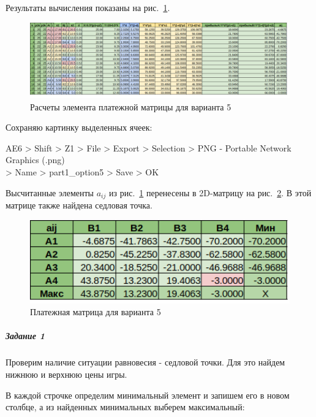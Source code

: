 Результаты вычисления показаны на рис.~\ref{fig:part1_option5}.

\begin{figure}[!h]
  \centering

  \includegraphics[width=18cm]
  {../sources/part1_option5.png}

  \caption{Расчеты элемента платежной матрицы для варианта 5}

  \label{fig:part1_option5}
\end{figure}

Сохраняю картинку выделенных ячеек:

AE6 > Shift > Z1 > File > Export > Selection > PNG - Portable Network Graphics (.png) \\
> Name > part1\_option5 > Save  > OK

Высчитанные элементы $a_{ij}$ из рис.~\ref{fig:part1_option5} перенесены в 2D-матрицу на рис.~\ref{fig:part1_option5_matrix}.
В этой матрице также найдена седловая точка.

\begin{figure}[!h]
  \centering

  \includegraphics[width=12cm]
  {../sources/part1_option5_matrix.png}

  \caption{Платежная матрица для варианта 5}

  \label{fig:part1_option5_matrix}
\end{figure}

\subparagraph{Задание 1} \hspace{0pt}

Проверим наличие ситуации равновесия - седловой точки. Для это найдем нижнюю и верхнюю цены игры.

В каждой строчке определим минимальный элемент и запишем его в новом столбце,
а из найденных минимальных выберем максимальный:

